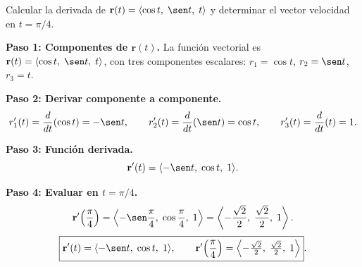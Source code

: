\begin{example}
Calcular la derivada de $\mathbf{r}(t) = \langle \cos t,\; \sen t,\; t \rangle$
y determinar el vector velocidad en $t = \pi/4$.
\begin{myproof}
\textbf{Paso 1: Componentes de $\mathbf{r}(t)$.}
La función vectorial es $\mathbf{r}(t) = \langle \cos t,\; \sen t,\; t \rangle$,
con tres componentes escalares: $r_1=\cos t$, $r_2=\sen t$, $r_3=t$.

\textbf{Paso 2: Derivar componente a componente.}
\[
r_1'(t) = \frac{d}{dt}(\cos t) = -\sen t, \qquad
r_2'(t) = \frac{d}{dt}(\sen t) = \cos t, \qquad
r_3'(t) = \frac{d}{dt}(t) = 1.
\]

\textbf{Paso 3: Función derivada.}
\[
\mathbf{r}'(t) = \langle -\sen t,\; \cos t,\; 1 \rangle.
\]

\textbf{Paso 4: Evaluar en $t = \pi/4$.}
\[
\mathbf{r}'\!\left(\frac{\pi}{4}\right)
= \left\langle -\sen\frac{\pi}{4},\; \cos\frac{\pi}{4},\; 1 \right\rangle
= \left\langle -\frac{\sqrt{2}}{2},\; \frac{\sqrt{2}}{2},\; 1 \right\rangle.
\]
\[
\boxed{\mathbf{r}'(t) = \langle -\sen t,\; \cos t,\; 1 \rangle,\qquad
       \mathbf{r}'\!\left(\frac{\pi}{4}\right)
       = \left\langle -\tfrac{\sqrt{2}}{2},\; \tfrac{\sqrt{2}}{2},\; 1 \right\rangle}.
\]
\end{myproof}
\end{example}

